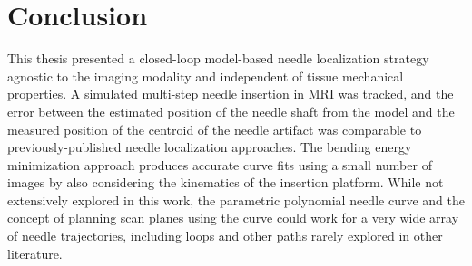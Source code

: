 \section{Conclusion}
This thesis presented a closed-loop model-based needle localization strategy agnostic to the imaging modality and independent of tissue mechanical properties. A simulated multi-step needle insertion in MRI was tracked, and the error between the estimated position of the needle shaft from the model and the measured position of the centroid of the needle artifact was comparable to previously-published needle localization approaches. The bending energy minimization approach produces accurate curve fits using a small number of  images by also considering the kinematics of the insertion platform. While not extensively explored in this work, the parametric polynomial needle curve and the concept of planning scan planes using the curve could work for a very wide array of needle trajectories, including loops and other paths rarely explored in other literature.
